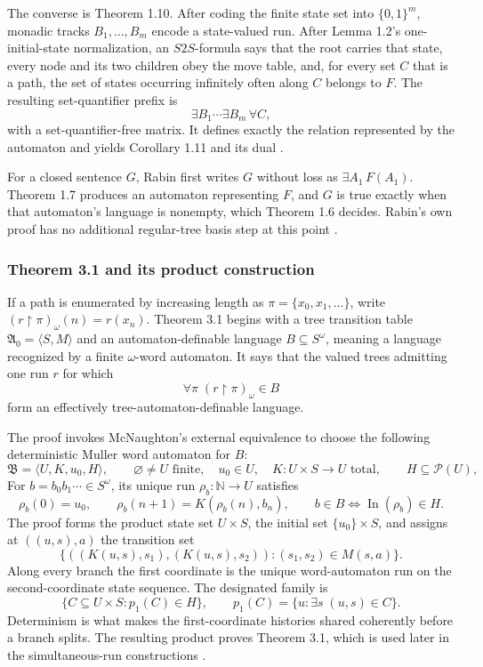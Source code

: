 The converse is Theorem 1.10.  After coding the finite state set into
\(\{0,1\}^m\), monadic tracks \(B_1,\ldots,B_m\) encode a state-valued run.
After Lemma 1.2's one-initial-state normalization, an \(S2S\)-formula says that
the root carries that state, every node and its two children obey the move
table, and, for every set \(C\) that is a path, the set of states occurring
infinitely often along \(C\) belongs to \(F\).
The resulting set-quantifier prefix is
\[
 \exists B_1\cdots\exists B_m\,\forall C,
\]
with a set-quantifier-free matrix.  It defines exactly the relation represented
by the automaton and yields Corollary 1.11 and its dual
\cite[pp.~9--10]{Rabin1969}.

For a closed sentence \(G\), Rabin first writes \(G\) without loss as
\(\exists A_1\,F(A_1)\).  Theorem 1.7 produces an automaton representing
\(F\), and \(G\) is true exactly when that automaton's language is nonempty,
which Theorem 1.6 decides.  Rabin's own proof has no additional regular-tree
basis step at this point
\cite[pp.~9--10]{Rabin1969}.

\subsubsection{Theorem 3.1 and its product construction}

If a path is enumerated by increasing length as
\(\pi=\{x_0,x_1,\ldots\}\), write
\((r\mathbin{\upharpoonright}\pi)_\omega(n)=r(x_n)\).  Theorem 3.1 begins
with a tree transition table \(\mathfrak A_0=\langle S,M\rangle\) and an
automaton-definable language \(B\subseteq S^\omega\), meaning a language
recognized by a finite \(\omega\)-word automaton.  It says that the
valued trees admitting one run \(r\) for which
\[
 \forall\pi\;
 (r\mathbin{\upharpoonright}\pi)_\omega\in B
\]
form an effectively tree-automaton-definable language.

The proof invokes McNaughton's external equivalence to choose the following
deterministic Muller word automaton for \(B\):
\[
 \mathfrak B=\langle U,K,u_0,H\rangle,
 \qquad
 \varnothing\neq U\text{ finite},
 \quad u_0\in U,
 \quad K:U\times S\longrightarrow U\text{ total},
 \qquad H\subseteq\mathcal P(U),
\]
For \(b=b_0b_1\cdots\in S^\omega\), its unique run
\(\rho_b:\mathbb N\to U\) satisfies
\[
 \rho_b(0)=u_0,
 \qquad
 \rho_b(n+1)=K(\rho_b(n),b_n),
 \qquad
 b\in B\Longleftrightarrow\operatorname{In}(\rho_b)\in H.
\]
The proof forms the product state set \(U\times S\), the initial set
\(\{u_0\}\times S\), and assigns at \(((u,s),a)\) the transition set
\[
 \bigl\{
      ((K(u,s),s_1),(K(u,s),s_2)):
      (s_1,s_2)\in M(s,a)
 \bigr\}.
\]
Along every branch the first coordinate is the unique word-automaton run on
the second-coordinate state sequence.  The designated family is
\[
 \{C\subseteq U\times S:p_1(C)\in H\},
 \qquad
 p_1(C)=\{u:\exists s\;(u,s)\in C\}.
\]
Determinism is what makes the first-coordinate histories shared coherently
before a branch splits.  The resulting product proves Theorem 3.1, which is
used later in the simultaneous-run constructions
\cite{McNaughton1966}\cite[pp.~17--19]{Rabin1969}.


